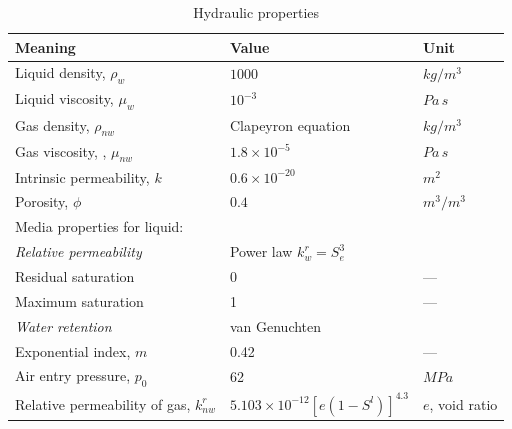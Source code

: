\begin{table}[!htb]
\centering
\begin{tabular}{lll}
\hline\noalign{\smallskip}
Meaning & Value & Unit \\
\hline
Liquid density, $\rho _{w}$ & $1000$ & $kg/m^3$\\
Liquid viscosity, $\mu_w$ &$10^{-3}$ & $Pa\,s$\\
Gas density,  $\rho _{nw}$ & Clapeyron equation & $kg/m^3$\\
Gas viscosity, , $\mu _{nw}$ &$1.8\times10^{-5}$ & $Pa\,s$\\
Intrinsic permeability, $k$ & $0.6\times10^{-20}$ & $m^2$\\
Porosity, $\phi $ & $0.4$ & $m^3/m^3$ \\
Media properties for liquid: &  & \\
\textit{Relative permeability} & Power law $k_{w}^r=S_e^3$  & \\
Residual saturation & 0 &--- \\
Maximum saturation & 1 &--- \\
\textit{Water retention} & van Genuchten  & \\
Exponential index, $m$ & 0.42 &--- \\
Air entry pressure, $p_0$& 62 &$MPa$ \\
Relative permeability of gas, $k_{nw}^r$ & $5.103\times10^{-12}\left[e(1-S^l)\right]^{4.3}$ & $e$, void ratio\\
\hline
\end{tabular}
\caption{Hydraulic properties} %
\label{tab:hydromat}
\end{table}

